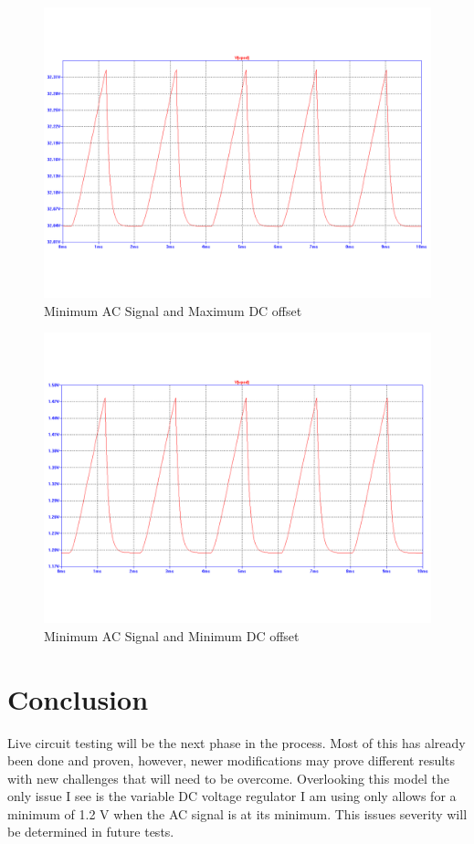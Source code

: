 \documentclass[12pt]{report}
\begin{document}
\begin{figure}[h!]
\centering
\includegraphics[width=\textwidth]{min_ssac_amp_dc.png}
\caption{Minimum AC Signal and Maximum DC offset}
\label{fig:minmax}
\end{figure}

\begin{figure}[h!]
\centering
\includegraphics[width=\textwidth]{min_ssac_amp_no_dc.png}
\caption{Minimum AC Signal and Minimum DC offset}
\label{fig:minmin}
\end{figure}

\section{Conclusion}
Live circuit testing will be the next phase in the process. Most of this has already been done and proven, however, newer modifications may prove different results with new challenges that will need to be overcome. Overlooking this model the only issue I see is the variable DC voltage regulator I am using only allows for a minimum of 1.2 V when the AC signal is at its minimum. This issues severity will be determined in future tests.
\end{document}
